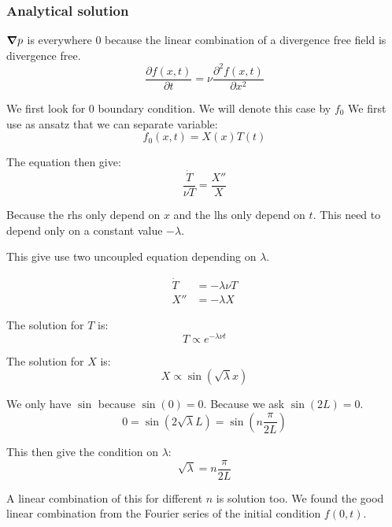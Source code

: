 \subsubsection{Analytical solution}

${\boldsymbol {\nabla}}p$ is everywhere 0 because the linear combination of a divergence free field is divergence free.
\begin{equation}
\frac{\partial f(x,t)}{\partial t}=\nu\frac{\partial^2 f(x,t)}{\partial x^2}
\end{equation}

We first look for 0 boundary condition. We will denote this case by $f_0$
We first use as ansatz that we can separate variable:
\begin{equation}
 f_0(x,t)=X(x)T(t)
\end{equation}

The equation then give:
\begin{equation}
	\frac{\dot{T}}{\nu T}=\frac{X''}{X}
\end{equation}

Because the rhs only depend on $x$ and the lhs only depend on $t$. This need to depend only on a constant value $-\lambda$.

This give use two uncoupled equation depending on $\lambda$.

\begin{align}
\dot{T}&=-\lambda \nu T\\
X''&=-\lambda X
\end{align}

The solution for $T$ is:
\begin{equation}
  T\propto e^{-\lambda \nu t}
\end{equation}

The solution for $X$ is:
\begin{equation}
	X\propto \sin(\sqrt{\lambda} x)
\end{equation}

We only have $\sin$ because $\sin(0)=0$.
Because we ask $\sin(2L)=0$.
\begin{equation}
	0=\sin(2\sqrt{\lambda} L)=\sin\left(n\frac{\pi}{2L}\right)
\end{equation}

This then give the condition on $\lambda$:
\begin{equation}
	\sqrt{\lambda}=n\frac{\pi}{2L}
\end{equation}

A linear combination of this for different $n$ is solution too.
We found the good linear combination from the Fourier series of the initial condition $f(0,t)$.

